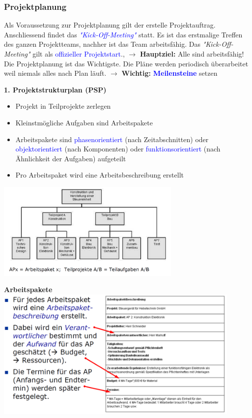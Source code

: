 \subsubsection{Projektplanung}
Als Voraussetzung zur Projektplanung gilt der erstelle Projektauftrag. Anschliessend findet das \textcolor{blue}{\textit{"Kick-Off-Meeting"}} statt. Es ist das erstmalige Treffen des ganzen Projektteams, nachher ist das Team arbeitsfähig. \newline Das \textit{"Kick-Off-Meeting"} gilt als \textcolor{blue}{offizieller Projektstart}., $\rightarrow$ \textbf{Hauptziel:} Alle sind arbeitsfähig!\\
Die Projektplanung ist das Wichtigste. Die Pläne werden periodisch überarbeitet weil niemals alles nach Plan läuft. \newline 
$\rightarrow$ \textbf{Wichtig:} \textcolor{blue}{\textbf{Meilensteine}} setzen
\vspace{0.2cm}
\\
\begin{minipage}{10cm}
	\textbf{1. Projektstrukturplan (PSP)}
	\begin{itemize}
		\item Projekt in Teilprojekte zerlegen
		\item Kleinstmögliche Aufgaben sind Arbeitspakete
		\item Arbeitspakete sind \textcolor{blue}{phasenorientiert} (nach Zeitabschnitten) oder \textcolor{blue}{objektorientiert} (nach Komponenten) oder \textcolor{blue}{funktionsorientiert} (nach Ähnlichkeit der Aufgaben) aufgeteilt
		\item Pro Arbeitspaket wird eine Arbeitsbeschreibung erstellt
	\end{itemize} 	
\end{minipage}
\begin{minipage}{9cm}
	\includegraphics[width=9cm]{images/PSP.png}
\end{minipage}
\clearpage
\pagebreak
\textbf{Arbeitspakete}\\
\includegraphics[width = 12cm]{images/arbeitsbeschreibung}

